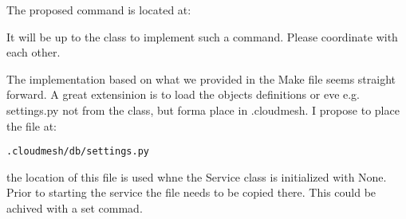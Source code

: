 The proposed command is located at:


It will be up to the class to implement such a command. Please
coordinate with each other.

The implementation based on what we provided in the Make file seems
straight forward. A great extensinion is to load the objects definitions
or eve e.g. settings.py not from the class, but forma place in
.cloudmesh. I propose to place the file at:

\begin{verbatim}
.cloudmesh/db/settings.py
\end{verbatim}

the location of this file is used whne the Service class is initialized
with None. Prior to starting the service the file needs to be copied
there. This could be achived with a set commad.
